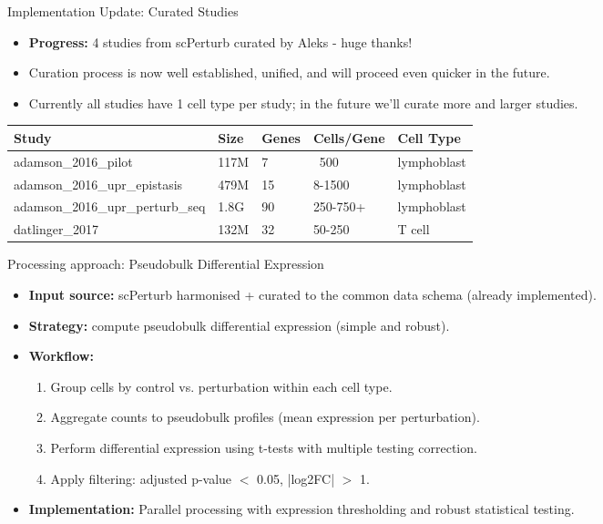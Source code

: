 \documentclass[handout]{beamer}
\begin{document}
\begin{frame}{Implementation Update: Curated Studies}
    \begin{itemize}
        \item \textbf{Progress:} 4 studies from scPerturb curated by Aleks - huge thanks!
        \item Curation process is now well established, unified, and will proceed even quicker in the future.
        \item Currently all studies have 1 cell type per study; in the future we'll curate more and larger studies.
    \end{itemize}
    
    \vspace{1em}
    \small
    \begin{tabular}{@{}p{3.5cm}p{1cm}p{1.2cm}p{1.5cm}p{1.5cm}@{}}
        \toprule
        \textbf{Study} & \textbf{Size} & \textbf{Genes} & \textbf{Cells/Gene} & \textbf{Cell Type} \\
        \midrule
        adamson\_2016\_pilot & 117M & 7 & ~500 & lymphoblast \\
        adamson\_2016\_upr\_epistasis & 479M & 15 & 8-1500 & lymphoblast \\
        adamson\_2016\_upr\_perturb\_seq & 1.8G & 90 & 250-750+ & lymphoblast \\
        datlinger\_2017 & 132M & 32 & 50-250 & T cell \\
        \bottomrule
    \end{tabular}
\end{frame}

\begin{frame}{Processing approach: Pseudobulk Differential Expression}
    \begin{itemize}
        \item \textbf{Input source:} scPerturb harmonised + curated to the common data schema (already implemented).
        \item \textbf{Strategy:} compute pseudobulk differential expression (simple and robust).
        \item \textbf{Workflow:}
        \begin{enumerate}
            \item Group cells by control vs. perturbation within each cell type.
            \item Aggregate counts to pseudobulk profiles (mean expression per perturbation).
            \item Perform differential expression using t-tests with multiple testing correction.
            \item Apply filtering: adjusted p-value $<$ 0.05, |log2FC| $>$ 1.
        \end{enumerate}
        \item \textbf{Implementation:} Parallel processing with expression thresholding and robust statistical testing.
    \end{itemize}
\end{frame}
\end{document}
